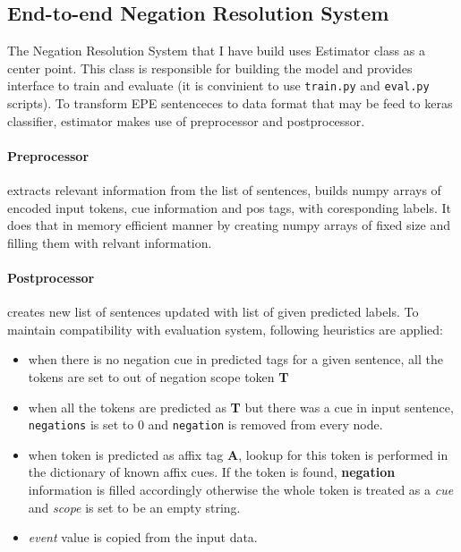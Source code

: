 \documentclass{article}
\begin{document}
\subsection{End-to-end Negation Resolution System}
The Negation Resolution System that I have build uses Estimator class as a center point.
This class is responsible for building the model and provides interface to train and evaluate 
(it is convinient to use \lstinline{train.py} and \lstinline{eval.py} scripts). To transform
EPE sentenceces to data format that may be feed to keras classifier, estimator makes use of
preprocessor and postprocessor.
\paragraph{Preprocessor} extracts relevant information from the list of sentences,
builds numpy arrays of encoded input tokens, cue information and pos tags, with coresponding labels.
It does that in memory efficient manner by creating numpy arrays of fixed size and filling them with
relvant information.
\paragraph{Postprocessor} creates new list of sentences updated with list of given predicted labels.
To maintain compatibility with evaluation system, following heuristics are applied:
\begin{itemize}
\item when there is no negation cue in predicted tags for a given sentence, all the tokens are set to
out of negation scope token \textbf{T}
\item when all the tokens are predicted as \textbf{T} but there was a cue in input sentence,
\lstinline{negations} is set to 0 and \lstinline{negation} is removed from every node.
\item when token is predicted as affix tag \textbf{A}, lookup for this token is performed in the dictionary
of known affix cues. If the token is found, \textbf{negation} information is filled accordingly otherwise
the whole token is treated as a \textit{cue} and \textit{scope} is set to be an empty string.
\item \textit{event} value is copied from the input data.
\end{itemize}
\end{document}
